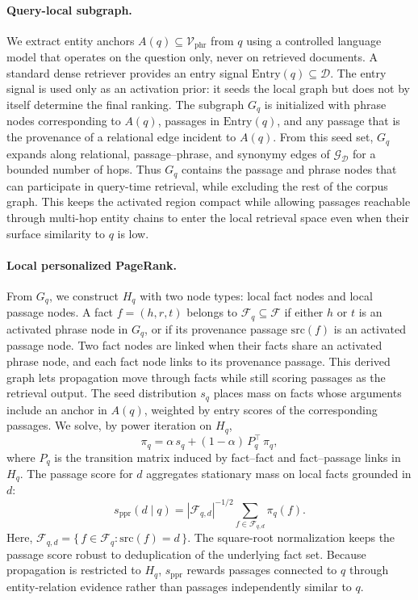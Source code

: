 \paragraph{Query-local subgraph.}
We extract entity anchors $A(q) \subseteq \mathcal{V}_{\mathrm{phr}}$
from $q$ using a controlled language model that operates on the question
only, never on retrieved documents. A standard dense retriever provides
an entry signal $\mathrm{Entry}(q) \subseteq \mathcal{D}$. The entry
signal is used only as an activation prior: it seeds the local graph but
does not by itself determine the final ranking. The subgraph $G_q$ is
initialized with phrase nodes corresponding to $A(q)$, passages in
$\mathrm{Entry}(q)$, and any passage that is the provenance of a
relational edge incident to $A(q)$. From this seed set, $G_q$ expands
along relational, passage--phrase, and synonymy edges of
$\mathcal{G}_{\mathcal{D}}$ for a bounded number of hops. Thus $G_q$
contains the passage and phrase nodes that can participate in query-time
retrieval, while excluding the rest of the corpus graph. This keeps the
activated region compact while allowing passages reachable through
multi-hop entity chains to enter the local retrieval space even when
their surface similarity to $q$ is low.

\paragraph{Local personalized PageRank.}
From $G_q$, we construct $H_q$ with two node types: local fact nodes and
local passage nodes. A fact $f=(h,r,t)$ belongs to
$\mathcal{F}_q \subseteq \mathcal{F}$ if either $h$ or $t$ is an
activated phrase node in $G_q$, or if its provenance passage
$\mathrm{src}(f)$ is an activated passage node. Two fact nodes are linked
when their facts share an activated phrase node, and each fact node links
to its provenance passage. This derived graph lets propagation move
through facts while still scoring passages as the retrieval output. The
seed distribution $s_q$ places mass on facts whose arguments include an
anchor in $A(q)$, weighted by entry scores of the corresponding passages.
We solve, by power iteration on $H_q$,
\begin{equation}
\label{eq:local-ppr}
\pi_q = \alpha\, s_q + (1-\alpha)\, P_q^{\!\top}\, \pi_q,
\end{equation}
where $P_q$ is the transition matrix induced by fact--fact and
fact--passage links in $H_q$. The passage score for $d$ aggregates
stationary mass on local facts grounded in $d$:
\begin{equation}
\label{eq:passage-score}
s_{\mathrm{ppr}}(d \mid q)
=
|\mathcal{F}_{q,d}|^{-1/2}
\sum_{f \in \mathcal{F}_{q,d}} \pi_q(f).
\end{equation}
Here,
$\mathcal{F}_{q,d}=\{\,f\in\mathcal{F}_q:\mathrm{src}(f)=d\,\}$.
The square-root normalization keeps the passage score robust to
deduplication of the underlying fact set. Because propagation is
restricted to $H_q$, $s_{\mathrm{ppr}}$ rewards passages connected to
$q$ through entity-relation evidence rather than passages independently
similar to $q$.

